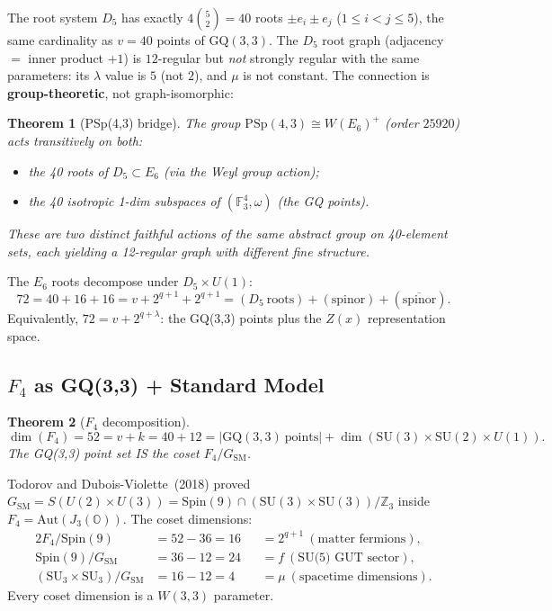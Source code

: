\documentclass[12pt,a4paper]{article}
\newtheorem{theorem}{Theorem}[section]
\theoremstyle{definition}
\newcommand{\GQ}{\mathrm{GQ}}
\newcommand{\PSp}{\mathrm{PSp}}
\newcommand{\SU}{\mathrm{SU}}
\newcommand{\Aut}{\mathrm{Aut}}
\newcommand{\FF}{\mathbb{F}}
\newcommand{\OO}{\mathbb{O}}
\newcommand{\ZZ}{\mathbb{Z}}
\begin{document}
The root system $D_5$ has exactly $4\binom{5}{2}=40$ roots $\pm e_i\pm e_j$
($1\le i<j\le 5$), the same cardinality as $v=40$ points of $\GQ(3,3)$.
The $D_5$ root graph (adjacency $=$ inner product $+1$) is $12$-regular
but \emph{not} strongly regular with the same parameters: its $\lambda$
value is $5$ (not $2$), and $\mu$ is not constant.  The connection is
\textbf{group-theoretic}, not graph-isomorphic:

\begin{theorem}[PSp(4,3) bridge]
The group $\PSp(4,3)\cong W(E_6)^+$ (order $25920$) acts transitively
on \emph{both}:
\begin{itemize}[nosep]
\item the 40 roots of $D_5\subset E_6$ (via the Weyl group action);
\item the 40 isotropic 1-dim subspaces of $(\FF_3^4,\omega)$ (the GQ points).
\end{itemize}
These are two \emph{distinct} faithful actions of the same abstract group
on 40-element sets, each yielding a 12-regular graph with different fine
structure.
\end{theorem}

The $E_6$ roots decompose under $D_5\times U(1)$:
\begin{equation}
  72 = 40 + 16 + 16 = v + 2^{q+1} + 2^{q+1}
  = (D_5\ \text{roots}) + (\text{spinor}) + (\overline{\text{spinor}}).
\end{equation}
Equivalently, $72 = v + 2^{q+\lambda}$: the GQ(3,3) points plus the
$Z(x)$ representation space.

\subsection{\texorpdfstring{$F_4$}{F4} as GQ(3,3) + Standard Model}

\begin{theorem}[$F_4$ decomposition]
\begin{equation}
  \dim(F_4) = 52 = v + k = 40 + 12
  = |\GQ(3,3)\ \text{points}| + \dim(\SU(3)\times\SU(2)\times U(1)).
\end{equation}
The GQ(3,3) point set IS the coset $F_4/G_{\mathrm{SM}}$.
\end{theorem}

Todorov and Dubois-Violette~(2018) proved
$G_{\mathrm{SM}}=S(U(2)\times U(3))=\mathrm{Spin}(9)\cap(\SU(3)\times\SU(3))/\ZZ_3$
inside $F_4=\Aut(J_3(\OO))$. The coset dimensions:
\begin{alignat}{2}
  F_4/\mathrm{Spin}(9) &= 52-36 = 16 &&= 2^{q+1}\ (\text{matter fermions}),\\
  \mathrm{Spin}(9)/G_{\mathrm{SM}} &= 36-12 = 24 &&= f\ (\text{SU(5) GUT sector}),\\
  (\SU_3\!\times\!\SU_3)/G_{\mathrm{SM}} &= 16-12 = 4 &&= \mu\ (\text{spacetime dimensions}).
\end{alignat}
Every coset dimension is a $W(3,3)$ parameter.
\end{document}

